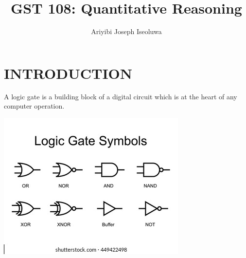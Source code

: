 \documentclass{article}
\begin{document}
	\title{GST 108: Quantitative Reasoning}

	\author{Ariyibi Joseph Iseoluwa}
\maketitle
\newpage
\tableofcontents
\newpage
\centering
\section{INTRODUCTION}
    A logic gate is a building block of a digital circuit which is at the heart of any computer operation.
    
   
   \includegraphics[width=1\linewidth]{logic}
\end{document}
